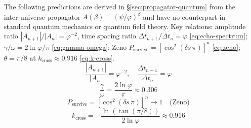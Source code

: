 \documentclass[12pt,a4paper]{article}
\begin{document}
The following predictions are derived in \S\ref{sec:propagator-quantum} from the inter-universe propagator $A(\beta) = (\psi/\varphi)^\beta$ and have no counterpart in standard quantum mechanics or quantum field theory. Key relations: amplitude ratio $|A_{n+1}|/|A_n| = \varphi^{-2}$, time spacing ratio $\Delta t_{n+1}/\Delta t_n = \varphi$ \eqref{eq:echo-spectrum}; $\gamma/\omega = 2\ln\varphi/\pi$ \eqref{eq:gamma-omega}; Zeno $P_{\mathrm{survive}} = [\cos^2(\delta s\,\pi)]^n$ \eqref{eq:zeno}; $\theta = \pi/8$ at $k_{\mathrm{cross}} \approx 0.916$ \eqref{eq:k-cross}.
\begin{equation}
\frac{|A_{n+1}|}{|A_n|} = \varphi^{-2}, \quad \frac{\Delta t_{n+1}}{\Delta t_n} = \varphi \label{eq:echo-spectrum}
\end{equation}
\begin{equation}
\frac{\gamma}{\omega} = \frac{2\ln\varphi}{\pi} \approx 0.306 \label{eq:gamma-omega}
\end{equation}
\begin{equation}
P_{\mathrm{survive}} = [\cos^2(\delta s\,\pi)]^n \to 1 \quad\text{(Zeno)} \label{eq:zeno}
\end{equation}
\begin{equation}
k_{\mathrm{cross}} = -\frac{\ln(\tan(\pi/8))}{2\ln\varphi} \approx 0.916 \label{eq:k-cross}
\end{equation}
\end{document}
